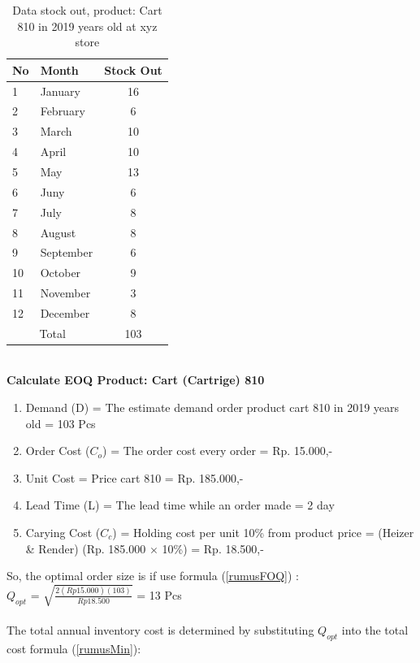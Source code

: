 \documentclass[12pt,a4paper,final]{iopart}
\begin{document}
\begin{table}[h!]
	\centering
	\caption{\label{tableOut} Data stock out, product: Cart 810 in 2019 years old at xyz store}
	\begin{tabular}{ llc }
		\hline
		\textbf{No} & \textbf{Month} & \textbf{Stock Out} \\
		\hline
		1 & January & 16  \\ 
		2 & February & 6  \\ 
		3 & March & 10 \\ 
		4 & April & 10 \\ 
		5 & May & 13 \\ 
		6 & Juny & 6 \\ 
		7 & July & 8 \\ 
		8 & August & 8 \\ 
		9 & September & 6 \\ 
		10 & October & 9 \\ 
		11 & November & 3 \\ 
		12 & December & 8 \\ 
		\hline
		\multicolumn{2}{c}{Total} & {103}\\
		\hline
	\end{tabular}
\end{table}\\
\textbf{Calculate EOQ Product: Cart (Cartrige) 810}
\begin{enumerate}[label=(\alph*)]
	\item Demand (D) = The estimate demand order product cart 810 in 2019 years old = 103 Pcs
	\item Order Cost ($C_o$) = The order cost every order = Rp. 15.000,-
	\item Unit Cost = Price cart 810 = Rp. 185.000,-
	\item Lead Time (L) = The lead time while an order made = 2 day
	\item Carying Cost ($C_c$) = Holding cost per unit 10\% from product price = (Heizer \& Render) (Rp. 185.000 $\times$ 10\%) = Rp. 18.500,-
\end{enumerate}
So, the optimal order size is if use formula (\ref{rumusFOQ}) :\\

$Q_{opt}$ = $\sqrt{\frac{2(Rp15.000)(103)}{Rp18.500}}$ = 13 Pcs\\ \\
The total annual inventory cost is determined by substituting $Q_{opt}$ into the total cost formula (\ref{rumusMin}):\\
\end{document}
